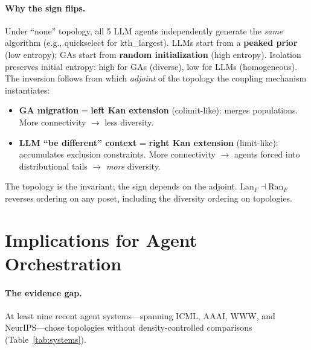 \documentclass[10pt,twocolumn]{article}
\begin{document}
\paragraph{Why the sign flips.}
Under ``none'' topology, all 5 LLM agents independently generate
the \emph{same} algorithm (e.g., quickselect for kth\_largest).
LLMs start from a \textbf{peaked prior} (low entropy); GAs start
from \textbf{random initialization} (high entropy). Isolation
preserves initial entropy: high for GAs (diverse), low for LLMs
(homogeneous). The inversion follows from which \emph{adjoint} of the
topology the coupling mechanism instantiates:

\begin{itemize}
  \item \textbf{GA migration} = \textbf{left Kan extension}
    (colimit-like): merges populations. More connectivity $\to$ less
    diversity.
  \item \textbf{LLM ``be different'' context} = \textbf{right Kan
    extension} (limit-like): accumulates exclusion constraints. More
    connectivity $\to$ agents forced into distributional tails $\to$
    \emph{more} diversity.
\end{itemize}

\noindent
The topology is the invariant; the sign depends on the adjoint.
$\mathrm{Lan}_F \dashv \mathrm{Ran}_F$ reverses ordering on any poset,
including the diversity ordering on topologies.

\section{Implications for Agent Orchestration}
\label{sec:implications}

\paragraph{The evidence gap.}
At least nine recent agent systems---spanning ICML, AAAI, WWW, and
NeurIPS---chose topologies without density-controlled comparisons
(Table~\ref{tab:systems}).
\end{document}
